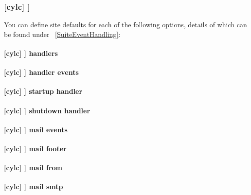 \subsubsection[{[}events{]}]{[cylc] \textrightarrow [[events]]}
\label{SiteCylcHooks}

You can define site defaults for each of the following options, details
of which can be found under ~\ref{SuiteEventHandling}:

\paragraph[handlers]{[cylc] \textrightarrow [[events]] \textrightarrow handlers}

\paragraph[handler events]{[cylc] \textrightarrow [[events]] \textrightarrow handler events}

\paragraph[startup handler]{[cylc] \textrightarrow [[events]] \textrightarrow startup handler}

\paragraph[shutdown handler]{[cylc] \textrightarrow [[events]] \textrightarrow shutdown handler}

\paragraph[mail events]{[cylc] \textrightarrow [[events]] \textrightarrow mail events}

\paragraph[mail footer]{[cylc] \textrightarrow [[events]] \textrightarrow mail footer}

\paragraph[mail from]{[cylc] \textrightarrow [[events]] \textrightarrow mail from}

\paragraph[mail smtp]{[cylc] \textrightarrow [[events]] \textrightarrow mail smtp}

